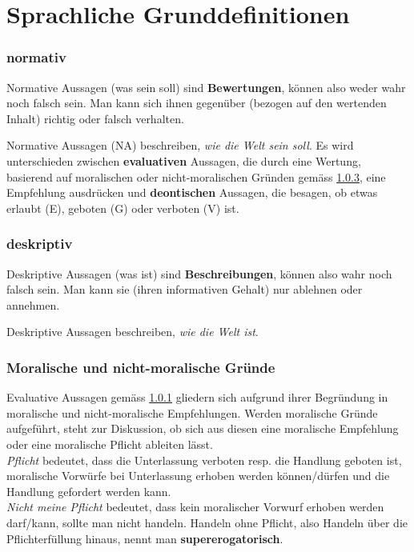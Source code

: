 \documentclass[../main.tex]{subfiles}
\begin{document}
\section{Sprachliche Grunddefinitionen}

\subsubsection{normativ} \label{normative}
\begin{warningbox}
Normative Aussagen (was sein soll) sind \textbf{Bewertungen}, können also weder wahr noch falsch sein. Man kann sich ihnen gegenüber (bezogen auf den wertenden Inhalt) richtig oder falsch verhalten.
\end{warningbox}
Normative Aussagen (NA) beschreiben, \textit{wie die Welt sein soll}. Es wird unterschieden zwischen \textbf{evaluativen} Aussagen, die durch eine Wertung, basierend auf moralischen oder nicht-moralischen Gründen gemäss \ref{moralAndNonMoralReasons}, eine Empfehlung ausdrücken und \textbf{deontischen} Aussagen, die besagen, ob etwas erlaubt (E), geboten (G) oder verboten (V) ist.


\subsubsection{deskriptiv} \label{descriptive}
\begin{warningbox}
Deskriptive Aussagen (was ist) sind \textbf{Beschreibungen}, können also wahr noch falsch sein. Man kann sie (ihren informativen Gehalt) nur ablehnen oder annehmen. 
\end{warningbox}
Deskriptive Aussagen beschreiben, \textit{wie die Welt ist}.


\subsubsection{Moralische und nicht-moralische Gründe} \label{moralAndNonMoralReasons}
Evaluative Aussagen gemäss \ref{normative} gliedern sich aufgrund ihrer Begründung in moralische und nicht-moralische Empfehlungen. Werden moralische Gründe aufgeführt, steht zur Diskussion, ob sich aus diesen eine moralische Empfehlung oder eine moralische Pflicht ableiten lässt. 
\\\textit{Pflicht} bedeutet, dass die Unterlassung verboten resp. die Handlung geboten ist, moralische Vorwürfe bei Unterlassung erhoben werden können/dürfen und die Handlung gefordert werden kann. 
\\\textit{Nicht meine Pflicht} bedeutet, dass kein moralischer Vorwurf erhoben werden darf/kann, sollte man nicht handeln. Handeln ohne Pflicht, also Handeln über die Pflichterfüllung hinaus, nennt man \textbf{supererogatorisch}.
\end{document}
